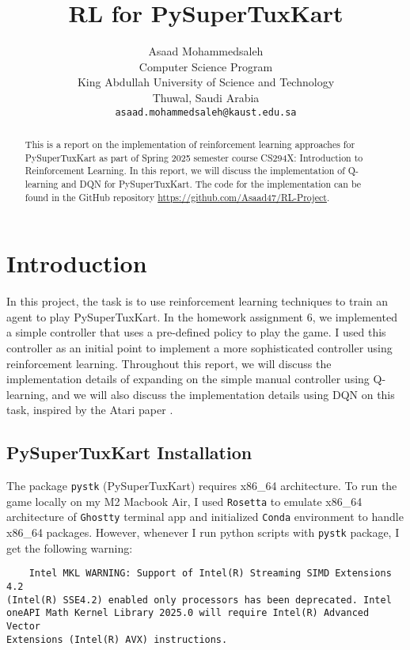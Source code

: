 \documentclass{article}
\title{RL for PySuperTuxKart}
\author{%
  Asaad Mohammedsaleh \\
  Computer Science Program\\
  King Abdullah University of Science and Technology\\
  Thuwal, Saudi Arabia \\
  \texttt{asaad.mohammedsaleh@kaust.edu.sa} \\
}
\begin{document}
\maketitle


\begin{abstract}
  This is a report on the implementation of reinforcement learning approaches for PySuperTuxKart 
  as part of Spring 2025 semester course CS294X: Introduction to Reinforcement Learning.
  In this report, we will discuss the implementation of Q-learning and DQN for PySuperTuxKart.
  The code for the implementation can be found in the GitHub repository \url{https://github.com/Asaad47/RL-Project}.
\end{abstract}


\section{Introduction}

In this project, the task is to use reinforcement learning techniques to train an agent to play PySuperTuxKart. 
In the homework assignment 6, we implemented a simple controller that uses a pre-defined policy to play the game.
I used this controller as an initial point to implement a more sophisticated controller using reinforcement learning.
Throughout this report, we will discuss the implementation details of expanding on the simple manual controller using Q-learning, and 
we will also discuss the implementation details using DQN on this task, inspired by the Atari paper \citep{mnih, mnih2}.

\subsection{PySuperTuxKart Installation}

The package \texttt{pystk} (PySuperTuxKart) requires x86\_64 architecture. To run the game locally on my M2 Macbook Air, I used \texttt{Rosetta} 
to emulate x86\_64 architecture of \texttt{Ghostty} terminal app and initialized \texttt{Conda} environment to handle x86\_64 packages.
However, whenever I run python scripts with \texttt{pystk} package, I get the following warning:

\begin{verbatim}
    Intel MKL WARNING: Support of Intel(R) Streaming SIMD Extensions 4.2 
(Intel(R) SSE4.2) enabled only processors has been deprecated. Intel 
oneAPI Math Kernel Library 2025.0 will require Intel(R) Advanced Vector 
Extensions (Intel(R) AVX) instructions.
\end{verbatim}
\end{document}
